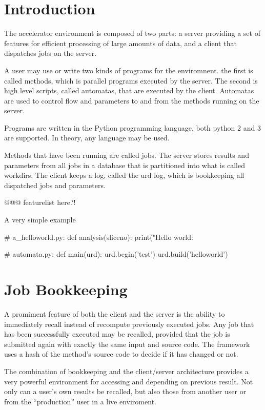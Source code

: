
\section{Introduction}

The accelerator environment is composed of two parts: a server
providing a set of features for efficient processing of large amounts
of data, and a client that dispatches jobs on the server.

A user may use or write two kinds of programs for the enviromnent.
the first is called methods, which is parallel programs executed by
the server.  The second is high level scripts, called automatas, that
are executed by the client.  Automatas are used to control flow and
parameters to and from the methods running on the server.

Programs are written in the Python programming language, both python 2
and 3 are supported.  In theory, any language may be used.

Methods that have been running are called jobs.  The server stores
results and parameters from all jobs in a database that is partitioned
into what is called workdirs.  The client keeps a log, called the urd
log, which is bookkeeping all dispatched jobs and parameters.

@@@ featurelist here?!

A very simple example

\begin{python}
# a_helloworld.py:
def analysis(sliceno):
  print("Hello world: %

# automata.py:
def main(urd):
  urd.begin('test')
  urd.build('helloworld')
\end{python}


\section{Job Bookkeeping}

A promiment feature of both the client and the server is the ability
to immediately recall instead of recompute previously executed jobs.
Any job that has been successfully executed may be recalled, provided
that the job is submitted again with exactly the same input and source
code.  The framework uses a hash of the method's source code to decide
if it has changed or not.

The combination of bookkeeping and the client/server architecture
provides a very powerful environment for accessing and depending on
previous result.  Not only can a user's own results be recalled, but
also those from another user or from the ``production'' user in a live
enviroment.

